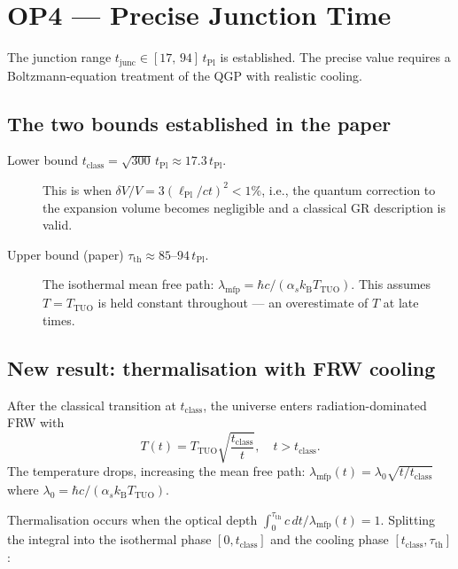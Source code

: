 \documentclass[12pt,a4paper]{article}
\theoremstyle{remark}
\newcommand{\tPl}{t_{\mathrm{Pl}}}
\newcommand{\lPl}{\ell_{\mathrm{Pl}}}
\newcommand{\kB}{k_{\mathrm{B}}}
\newcommand{\TTUO}{T_{\mathrm{TUO}}}
\newcommand{\junc}{t_{\mathrm{junc}}}
\begin{document}
\section{OP4 --- Precise Junction Time}
\label{sec:op4}

\begin{tcolorbox}[opbox,title={Open Problem 4}]
The junction range $\junc \in [17,\,94]\,\tPl$ is established.
The precise value requires a Boltzmann-equation treatment of the
QGP with realistic cooling.
\end{tcolorbox}

\subsection{The two bounds established in the paper}

\begin{description}
  \item[Lower bound $t_\mathrm{class} = \sqrt{300}\,\tPl \approx 17.3\,\tPl$.]
    This is when $\delta V/V = 3(\lPl/ct)^2 < 1\%$, i.e., the quantum
    correction to the expansion volume becomes negligible and a classical
    GR description is valid.

  \item[Upper bound (paper) $\tau_\mathrm{th} \approx 85\text{--}94\,\tPl$.]
    The isothermal mean free path: $\lambda_\mathrm{mfp} = \hbar c/(\alpha_s\kB\TTUO)$.
    This assumes $T = \TTUO$ is held constant throughout --- an overestimate
    of $T$ at late times.
\end{description}

\subsection{New result: thermalisation with FRW cooling}

After the classical transition at $t_\mathrm{class}$, the universe
enters radiation-dominated FRW with
\[
  T(t) = \TTUO\sqrt{\frac{t_\mathrm{class}}{t}}, \quad t > t_\mathrm{class}.
\]
The temperature drops, increasing the mean free path:
$\lambda_\mathrm{mfp}(t) = \lambda_0\sqrt{t/t_\mathrm{class}}$ where
$\lambda_0 = \hbar c/(\alpha_s\kB\TTUO)$.

Thermalisation occurs when the optical depth
$\int_0^{\tau_\mathrm{th}} c\,dt/\lambda_\mathrm{mfp}(t) = 1$.
Splitting the integral into the isothermal phase $[0, t_\mathrm{class}]$
and the cooling phase $[t_\mathrm{class}, \tau_\mathrm{th}]$:
\end{document}
